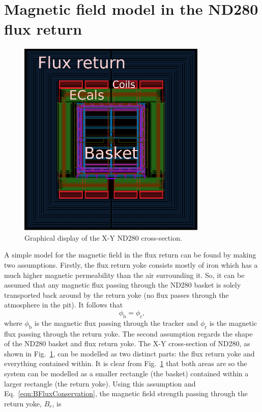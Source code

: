 \section{Magnetic field model in the ND280 flux return}
\label{sec:MagneticFieldModel}
\begin{figure}
  \centering
  \includegraphics[width=9cm]{images/magnetic_field/ND280FluxReturn}
  \caption{Graphical display of the X-Y ND280 cross-section.}
  \label{fig:ND280FluxReturn}
\end{figure}
A simple model for the magnetic field in the flux return can be found by making two assumptions.  Firstly, the flux return yoke consists mostly of iron which has a much higher magnetic permeability than the air surrounding it.  So, it can be assumed that any magnetic flux passing through the ND280 basket is solely transported back around by the return yoke (no flux passes through the atmosphere in the pit).  It follows that
\begin{equation}
  \phi_{\textrm{b}} = \phi_{\textrm{r}},
  \label{eqn:BFluxConservation}
\end{equation}
where $\phi_{\textrm{b}}$ is the magnetic flux passing through the tracker and $\phi_{\textrm{r}}$ is the magnetic flux passing through the return yoke.  The second assumption regards the shape of the ND280 basket and flux return yoke.  The X-Y cross-section of ND280, as shown in Fig.~\ref{fig:ND280FluxReturn}, can be modelled as two distinct parts: the flux return yoke and everything contained within.  It is clear from Fig.~\ref{fig:ND280FluxReturn} that both areas are  so the system can be modelled as a smaller rectangle (the basket) contained within a larger rectangle (the return yoke).  Using this assumption and Eq.~\ref{eqn:BFluxConservation}, the magnetic field strength passing through the return yoke, $B_{r}$, is
